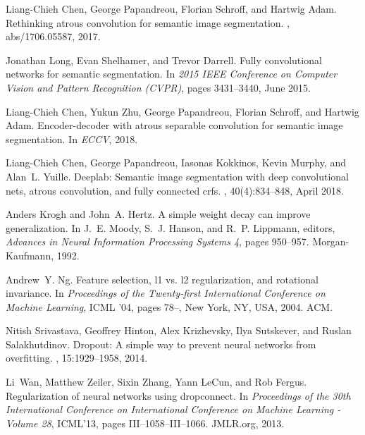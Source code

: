\documentclass{article}
\begin{document}
{\begin{thebibliography}{10}
Liang-Chieh Chen, George Papandreou, Florian Schroff, and Hartwig Adam.
\newblock Rethinking atrous convolution for semantic image segmentation.
, abs/1706.05587, 2017.

Jonathan Long, Evan Shelhamer, and Trevor Darrell.
\newblock Fully convolutional networks for semantic segmentation.
\newblock In {\em 2015 IEEE Conference on Computer Vision and Pattern
  Recognition (CVPR)}, pages 3431--3440, June 2015.

Liang-Chieh Chen, Yukun Zhu, George Papandreou, Florian Schroff, and Hartwig
  Adam.
\newblock Encoder-decoder with atrous separable convolution for semantic image
  segmentation.
\newblock In {\em ECCV}, 2018.

Liang-Chieh Chen, George Papandreou, Iasonas Kokkinos, Kevin Murphy, and
  Alan~L. Yuille.
\newblock Deeplab: Semantic image segmentation with deep convolutional nets,
  atrous convolution, and fully connected crfs.
,
  40(4):834--848, April 2018.

Anders Krogh and John~A. Hertz.
\newblock A simple weight decay can improve generalization.
\newblock In J.~E. Moody, S.~J. Hanson, and R.~P. Lippmann, editors, {\em
  Advances in Neural Information Processing Systems 4}, pages 950--957.
  Morgan-Kaufmann, 1992.

Andrew~Y. Ng.
\newblock Feature selection, l1 vs. l2 regularization, and rotational
  invariance.
\newblock In {\em Proceedings of the Twenty-first International Conference on
  Machine Learning}, ICML '04, pages 78--, New York, NY, USA, 2004. ACM.

Nitish Srivastava, Geoffrey Hinton, Alex Krizhevsky, Ilya Sutskever, and Ruslan
  Salakhutdinov.
\newblock Dropout: A simple way to prevent neural networks from overfitting.
, 15:1929--1958, 2014.

Li~Wan, Matthew Zeiler, Sixin Zhang, Yann LeCun, and Rob Fergus.
\newblock Regularization of neural networks using dropconnect.
\newblock In {\em Proceedings of the 30th International Conference on
  International Conference on Machine Learning - Volume 28}, ICML'13, pages
  III--1058--III--1066. JMLR.org, 2013.


\end{thebibliography}}
\end{document}
